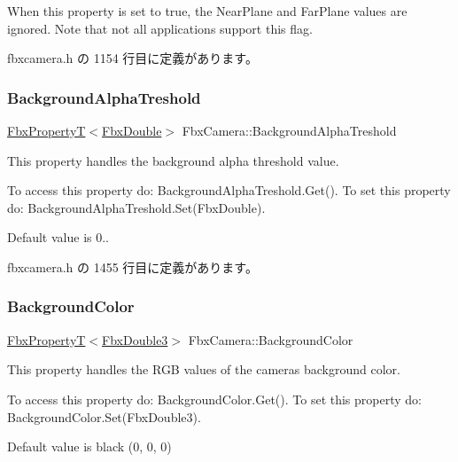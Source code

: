 When this property is set to true, the Near\+Plane and Far\+Plane values are ignored. Note that not all applications support this flag. 

 fbxcamera.\+h の 1154 行目に定義があります。

\mbox{\label{class_fbx_camera_adee33826ef47ba5fc4719c78b6e5d582}} 
\subsubsection{\texorpdfstring{Background\+Alpha\+Treshold}{BackgroundAlphaTreshold}}
{\footnotesize\ttfamily \hyperlink{class_fbx_property_t}{Fbx\+PropertyT}$<$\hyperlink{fbxtypes_8h_a171e72a1c46fc15c1a6c9c31948c1c5b}{Fbx\+Double}$>$ Fbx\+Camera\+::\+Background\+Alpha\+Treshold}

This property handles the background alpha threshold value.

To access this property do\+: Background\+Alpha\+Treshold.\+Get(). To set this property do\+: Background\+Alpha\+Treshold.\+Set(\+Fbx\+Double).

Default value is 0.. 

 fbxcamera.\+h の 1455 行目に定義があります。

\mbox{\label{class_fbx_camera_af50cc9dbfa39096cc1b9535e1b47d1d6}} 
\subsubsection{\texorpdfstring{Background\+Color}{BackgroundColor}}
{\footnotesize\ttfamily \hyperlink{class_fbx_property_t}{Fbx\+PropertyT}$<$\hyperlink{fbxtypes_8h_ae0a96f14cde566774c7553aa7523b7a7}{Fbx\+Double3}$>$ Fbx\+Camera\+::\+Background\+Color}

This property handles the R\+GB values of the camera\textquotesingle{}s background color.

To access this property do\+: Background\+Color.\+Get(). To set this property do\+: Background\+Color.\+Set(\+Fbx\+Double3).

Default value is black (0, 0, 0) 

